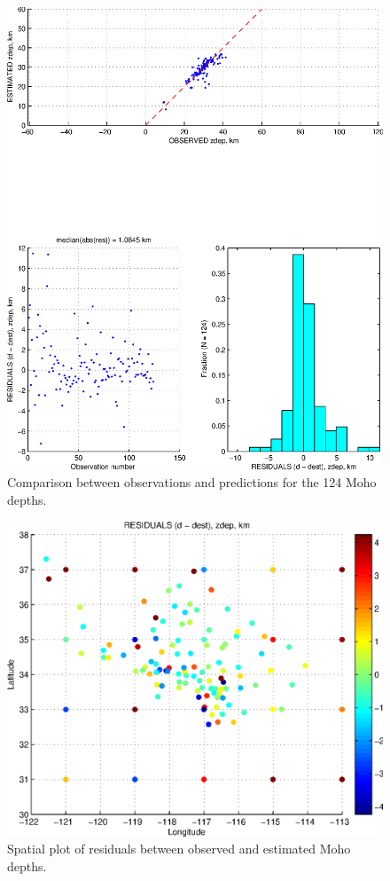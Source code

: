 \documentclass[11pt,titlepage,fleqn]{article}
\begin{document}
\begin{figure}
\includegraphics[width=16cm]{fig1D_5.eps}
\caption[]
{{
Comparison between observations and predictions for the 124 Moho depths.
\label{fig:fig1D_5}
}}
\end{figure}

\begin{figure}
\includegraphics[width=16cm]{fig1D_6.eps}
\caption[]
{{
Spatial plot of residuals between observed and estimated Moho depths.
\label{fig:fig1D_6}
}}
\end{figure}
\end{document}
